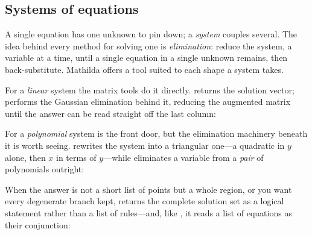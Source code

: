 \subsection{Systems of equations}
\label{ssec:intro-systems}

A single equation has one unknown to pin down; a \emph{system}
couples several. The idea behind every method for solving one is \emph{elimination}: reduce
the system, a variable at a time, until a single equation in a single unknown remains, then
back-substitute. Mathilda offers a tool suited to each shape a system takes.

For a \emph{linear} system the matrix tools do it
directly.  returns the solution vector;  performs the Gaussian
elimination behind it, reducing the augmented matrix until the
answer can be read straight off the last column:

\begin{codepairs}
\end{codepairs}

For a \emph{polynomial} system  is the front
door, but the elimination machinery beneath it is worth seeing.  rewrites
the system into a triangular one---a quadratic in $y$ alone, then $x$ in terms of
$y$---while  eliminates a variable from a \emph{pair} of polynomials outright:

\begin{codepairs}
\end{codepairs}

When the answer is not a short list of points but a whole region, or you want every
degenerate branch kept,  returns the complete solution set as a logical statement
rather than a list of rules---and, like , it reads a list of equations as their
conjunction:

